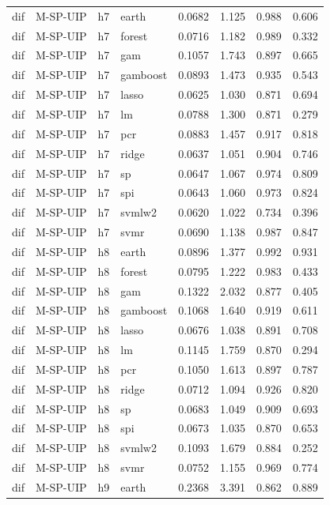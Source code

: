 \begin{ThreePartTable}
\begin{longtable}[t]{llclcccc}
\addlinespace
dif & M-SP-UIP & h7 & earth & 0.0682 & 1.125 & 0.988 & 0.606\\
dif & M-SP-UIP & h7 & forest & 0.0716 & 1.182 & 0.989 & 0.332\\
dif & M-SP-UIP & h7 & gam & 0.1057 & 1.743 & 0.897 & 0.665\\
dif & M-SP-UIP & h7 & gamboost & 0.0893 & 1.473 & 0.935 & 0.543\\
dif & M-SP-UIP & h7 & lasso & 0.0625 & 1.030 & 0.871 & 0.694\\
dif & M-SP-UIP & h7 & lm & 0.0788 & 1.300 & 0.871 & 0.279\\
dif & M-SP-UIP & h7 & pcr & 0.0883 & 1.457 & 0.917 & 0.818\\
dif & M-SP-UIP & h7 & ridge & 0.0637 & 1.051 & 0.904 & 0.746\\
dif & M-SP-UIP & h7 & sp & 0.0647 & 1.067 & 0.974 & 0.809\\
dif & M-SP-UIP & h7 & spi & 0.0643 & 1.060 & 0.973 & 0.824\\
dif & M-SP-UIP & h7 & svmlw2 & 0.0620 & 1.022 & 0.734 & 0.396\\
dif & M-SP-UIP & h7 & svmr & 0.0690 & 1.138 & 0.987 & 0.847\\
\addlinespace
dif & M-SP-UIP & h8 & earth & 0.0896 & 1.377 & 0.992 & 0.931\\
dif & M-SP-UIP & h8 & forest & 0.0795 & 1.222 & 0.983 & 0.433\\
dif & M-SP-UIP & h8 & gam & 0.1322 & 2.032 & 0.877 & 0.405\\
dif & M-SP-UIP & h8 & gamboost & 0.1068 & 1.640 & 0.919 & 0.611\\
dif & M-SP-UIP & h8 & lasso & 0.0676 & 1.038 & 0.891 & 0.708\\
dif & M-SP-UIP & h8 & lm & 0.1145 & 1.759 & 0.870 & 0.294\\
dif & M-SP-UIP & h8 & pcr & 0.1050 & 1.613 & 0.897 & 0.787\\
dif & M-SP-UIP & h8 & ridge & 0.0712 & 1.094 & 0.926 & 0.820\\
dif & M-SP-UIP & h8 & sp & 0.0683 & 1.049 & 0.909 & 0.693\\
dif & M-SP-UIP & h8 & spi & 0.0673 & 1.035 & 0.870 & 0.653\\
dif & M-SP-UIP & h8 & svmlw2 & 0.1093 & 1.679 & 0.884 & 0.252\\
dif & M-SP-UIP & h8 & svmr & 0.0752 & 1.155 & 0.969 & 0.774\\
\addlinespace
dif & M-SP-UIP & h9 & earth & 0.2368 & 3.391 & 0.862 & 0.889\\

\end{longtable}
\end{ThreePartTable}
